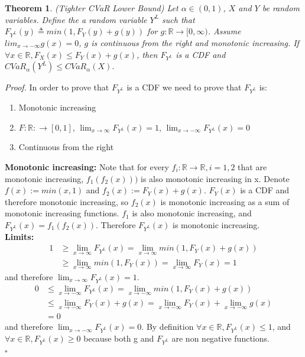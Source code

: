 \documentclass[letterpaper]{article} %
\newtheorem{theorem}{Theorem}[section]
\newenvironment{proof}{\noindent\textit{Proof.}}{\hfill$\square$}
\begin{document}
\begin{theorem}\label{thm:tight_cvar_lower_bound}
	(Tighter CVaR Lower Bound) Let $\alpha \in (0,1)$, $X$ and $Y$ be random variables. Define the a random variable $Y^L$ such that $F_{Y^L}(y) \triangleq min(1, F_Y(y) + g(y))$ for $g:\mathbb{R}\rightarrow [0, \infty)$. Assume 
	$lim_{x \rightarrow -\infty}g(x)=0$, $g$ is continuous from the right and monotonic increasing.
	If $\forall x\in \mathbb{R}, F_X(x)\leq F_Y(x)+g(x)$, then $F_{Y^L}$ is a CDF and $CVaR_\alpha(Y^L)\leq CVaR_\alpha(X).$
\end{theorem}
\begin{proof}
	In order to prove that $F_{Y^L}$ is a CDF we need to prove that $F_{Y^L}$ is:
	\begin{enumerate}
		\item Monotonic increasing
		\item $F:\mathbb{R}:\rightarrow [0,1]$, $\lim_{x\rightarrow \infty}F_{Y^L}(x)=1$, $\lim_{x\rightarrow -\infty}F_{Y^L}(x)=0$
		\item Continuous from the right
	\end{enumerate}
	
	\textbf{Monotonic increasing:}
	Note that for every $f_i:\mathbb{R}\rightarrow \mathbb{R}, i=1,2$ that are monotonic increasing, $f_1(f_2(x)))$ is also monotonic increasing in x. Denote $f(x):=min(x,1)$ and $f_2(x):=F_Y(x)+g(x)$. $F_Y(x)$ is a CDF and therefore monotonic increasing, so $f_2(x)$ is monotonic increasing as a sum of monotonic increasing functions. $f_1$ is also monotonic increasing, and $F_{Y^L}(x)=f_1(f_2(x))$. Therefore $F_{Y^L}(x)$ is monotonic increasing. \\
	
	\textbf{Limits:} \begin{equation}
		\begin{aligned}
			1&\geq\lim_{x\rightarrow \infty} F_{Y^L}(x)=\lim_{x\rightarrow \infty} min(1,F_Y(x)+g(x)) \\
			&\geq \lim_{x\rightarrow \infty}min(1,F_Y(x))=\lim_{x\rightarrow \infty} F_Y(x)=1
		\end{aligned}
	\end{equation}
	and therefore $\lim_{x\rightarrow \infty} F_{Y^L}(x)=1$.
	$$\begin{aligned}
		0&\leq \lim_{x\rightarrow -\infty} F_{Y^L}(x)=\lim_{x\rightarrow -\infty} min(1,F_Y(x)+g(x)) \\
		&\leq \lim_{x\rightarrow -\infty} F_Y(x)+g(x) 
		=\lim_{x\rightarrow -\infty} F_Y(x)+\lim_{x\rightarrow -\infty} g(x) \\
		&=0	
	\end{aligned}$$
	and therefore $\lim_{x\rightarrow -\infty} F_{Y^L}(x)=0$. By definition $\forall x\in \mathbb{R},F_{Y^L}(x)\leq 1$, and $\forall x\in \mathbb{R},F_{Y^L}(x)\geq 0$ because both g and $F_{Y^L}$ are non negative functions. \\
	

\end{proof}
\end{document}
